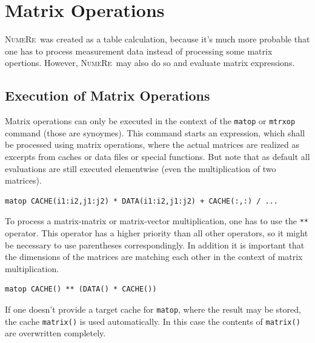 \documentclass[DIV=14,headsepline,footsepline]{scrbook}
\newcommand{\NR}{\textsc{Nu\-me\-Re}}
\begin{document}
		\chapter{Matrix Operations}
			\NR\ was created as a table calculation, because it's much more probable that one has to process measurement data instead of processing some matrix opertions. However, \NR\ may also do so and evaluate matrix expressions.
			\section{Execution of Matrix Operations}
				Matrix operations can only be executed in the context of the \verb+matop+ or \verb+mtrxop+ command (those are synoymes). This command starts an expression, which shall be processed using matrix operations, where the actual matrices are realized as excerpts from caches or data files or special functions. But note that as default all evaluations are still executed elementwise (even the multiplication of two matrices).
				\begin{lstlisting}
matop CACHE(i1:i2,j1:j2) * DATA(i1:i2,j1:j2) + CACHE(:,:) / ...
				\end{lstlisting}
				
				To process a matrix-matrix or matrix-vector multiplication, one has to use the \verb+**+ operator. This operator has a higher priority than all other operators, so it might be necessary to use parentheses correspondingly. In addition it is important that the dimensions of the matrices are matching each other in the context of matrix multiplication.
				\begin{lstlisting}
matop CACHE() ** (DATA() * CACHE())
				\end{lstlisting}
				
				If one doesn't provide a target cache for \verb+matop+, where the result may be stored, the cache \verb+matrix()+ is used automatically. In this case the contents of \verb+matrix()+ are overwritten completely.
				
\end{document}
